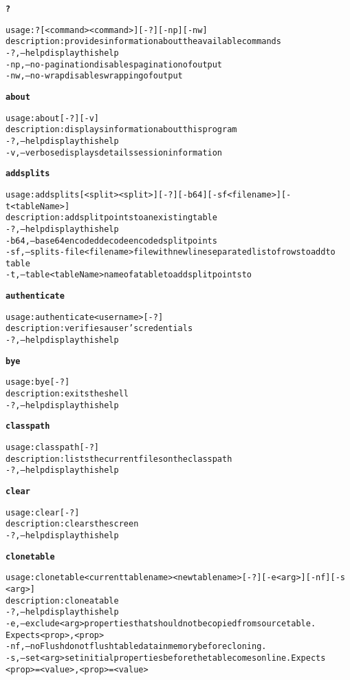 \begin{alltt}

\textbf{?}

    usage: ? [ <command>{ <command>} ] [-?] [-np] [-nw]
    description: provides information about the available commands
      -?,--help  display this help
      -np,--no-pagination  disables pagination of output
      -nw,--no-wrap  disables wrapping of output

\textbf{about}

    usage: about [-?] [-v]
    description: displays information about this program
      -?,--help  display this help
      -v,--verbose  displays details session information

\textbf{addsplits}

    usage: addsplits [<split>{ <split>} ] [-?] [-b64] [-sf <filename>] [-t <tableName>]
    description: add split points to an existing table
      -?,--help  display this help
      -b64,--base64encoded  decode encoded split points
      -sf,--splits-file <filename>  file with newline separated list of rows to add to
              table
      -t,--table <tableName>  name of a table to add split points to

\textbf{authenticate}

    usage: authenticate <username> [-?]
    description: verifies a user's credentials
      -?,--help  display this help

\textbf{bye}

    usage: bye [-?]
    description: exits the shell
      -?,--help  display this help

\textbf{classpath}

    usage: classpath [-?]
    description: lists the current files on the classpath
      -?,--help  display this help

\textbf{clear}

    usage: clear [-?]
    description: clears the screen
      -?,--help  display this help

\textbf{clonetable}

    usage: clonetable <current table name> <new table name> [-?] [-e <arg>] [-nf] [-s
              <arg>]
    description: clone a table
      -?,--help  display this help
      -e,--exclude <arg>  properties that should not be copied from source table.
              Expects <prop>{,<prop>}
      -nf,--noFlush  do not flush table data in memory before cloning.
      -s,--set <arg>  set initial properties before the table comes online. Expects
              <prop>=<value>{,<prop>=<value>}


\end{alltt}
